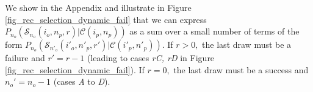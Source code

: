 \documentclass[9pt,twocolumn,twoside,lineno]{gsajnl}
\newcommand{\Coalc}[4]{\left(#1, #2 ; #3, #4 \right)}
\newcommand{\ms}{\mathcal{S}}
\begin{document}

We show in the Appendix and illustrate in Figure \ref{fig_rec_selection_dynamic_fail}  that we
can express $P_{n_o}(\mathcal{S}_{n_o}(i_o, n_p, r)| \mathcal{C}(i_p,n_p) )$ as a sum over a small number of terms
of the form $P_{n_o}(\mathcal{S}_{n'_o}(i'_o, n'_p, r')| \mathcal{C}(i'_p,n'_p) ).$ If $r>0,$ the last draw must be a failure
and $r' = r - 1$ (leading to cases \textit{rC, rD} in Figure \ref{fig_rec_selection_dynamic_fail}).
If $r=0,$ the last draw must be a success and $n_o' = n_o-1$ (cases \textit{A} to \textit{D}).


\end{document}
